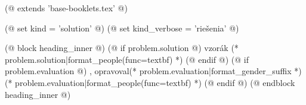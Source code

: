 (@ extends 'base-booklets.tex' @)

(@ set kind = 'solution' @)
(@ set kind_verbose = 'riešenia' @)

(@ block heading_inner @)
    (@ if problem.solution @)%
        vzorák (* problem.solution|format_people(func=textbf) *)%
    (@ endif @)%
    (@ if problem.evaluation @)%
        , opravoval(* problem.evaluation|format_gender_suffix *) (* problem.evaluation|format_people(func=textbf) *)%
    (@ endif @)%
(@ endblock heading_inner @)

